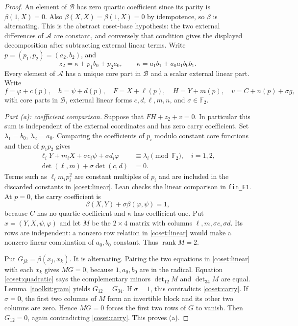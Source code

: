 \documentclass[11pt,a4paper]{article}
\theoremstyle{plain}
\theoremstyle{remark}
\theoremstyle{plain}
\newcommand{\F}{\mathbb F_2}
\newcommand{\rk}{\operatorname{rank}}
\begin{document}
\begin{proof}
An element of $\mathcal B$ has zero quartic coefficient since its parity is $\beta(1,X)=0$. Also $\beta(X,X)=\beta(1,X)=0$ by idempotence, so $\beta$ is alternating. This is the abstract coset-base hypothesis: the two external differences of $\mathcal A$ are constant, and conversely that condition gives the displayed decomposition after subtracting external linear terms. Write $p=(p_1,p_2)=(a_2,b_2)$, and
\[
z_2=\kappa+p_1b_0+p_2a_0,\qquad \kappa=a_1b_1+a_0a_1b_0b_1.
\]
Every element of $\mathcal A$ has a unique core part in $\mathcal B$ and a scalar external linear part. Write
\[
f=\varphi+c(p),\quad h=\psi+d(p),\quad
F=X+\ell(p),\quad H=Y+m(p),\quad
v=C+n(p)+\sigma g,
\]
with core parts in $\mathcal B$, external linear forms $c,d,\ell,m,n$, and $\sigma\in\F$.

\emph{Part (a): coefficient comparison.} Suppose that $FH+z_2+v=0$. In particular this sum is independent of the external coordinates and has zero carry coefficient. Set $\lambda_1=b_0$, $\lambda_2=a_0$. Comparing the coefficients of $p_i$ modulo constant core functions and then of $p_1p_2$ gives
\begin{align}
\ell_iY+m_iX+\sigma c_i\psi+\sigma d_i\varphi&\equiv\lambda_i\pmod{\F},\quad i=1,2,\label{coset:linear}\\
\det(\ell,m)+\sigma\det(c,d)&=0.\label{coset:quadratic}
\end{align}
Terms such as $\ell_i m_i p_i^2$ are constant multiples of $p_i$ and are included in the discarded constants in \eqref{coset:linear}. Lean checks the linear comparison in \nolinkurl{fin_E1}. At $p=0$, the carry coefficient is
\begin{equation}\label{coset:carry}
\beta(X,Y)+\sigma\beta(\varphi,\psi)=1,
\end{equation}
because $C$ has no quartic coefficient and $\kappa$ has coefficient one.
Put $x=(Y,X,\psi,\varphi)$ and let $M$ be the $2\times4$ matrix with columns $\ell,m,\sigma c,\sigma d$. Its rows are independent: a nonzero row relation in \eqref{coset:linear} would make a nonzero linear combination of $a_0,b_0$ constant. Thus $\rk M=2$.

Put $G_{jk}=\beta(x_j,x_k)$. It is alternating. Pairing the two equations in \eqref{coset:linear} with each $x_k$ gives $MG=0$, because $1,a_0,b_0$ are in the radical. Equation \eqref{coset:quadratic} says the complementary minors $\det_{12}M$ and $\det_{34}M$ are equal. Lemma~\ref{toolkit:gram} yields $G_{12}=G_{34}$. If $\sigma=1$, this contradicts \eqref{coset:carry}. If $\sigma=0$, the first two columns of $M$ form an invertible block and its other two columns are zero. Hence $MG=0$ forces the first two rows of $G$ to vanish. Then $G_{12}=0$, again contradicting \eqref{coset:carry}. This proves (a).


\end{proof}
\end{document}
